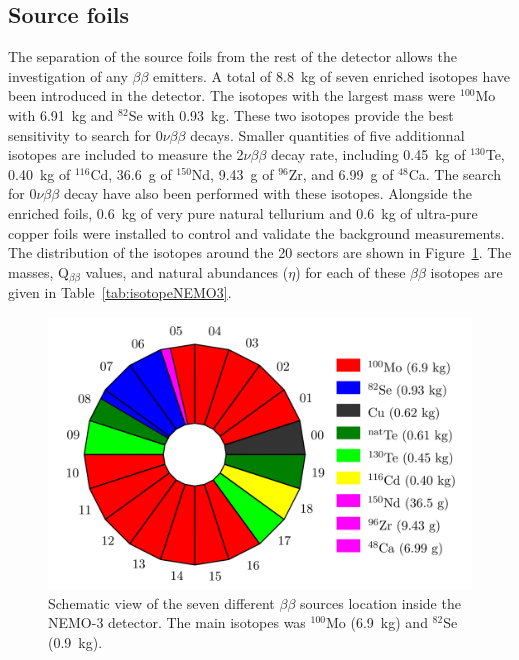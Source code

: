 \documentclass[main.tex]{subfiles}
\begin{document}
\FloatBarrier


\subsection{Source foils}


\NI The separation of the source foils from the rest of the detector allows the investigation of any $\beta\beta$ emitters. A total of 8.8~kg of seven enriched isotopes have been introduced in the detector. The isotopes with the largest mass were $^{\text{100}}$Mo with 6.91~kg and $^{\text{82}}$Se with 0.93~kg. These two isotopes provide the best sensitivity to search for 0$\nu\beta\beta$ decays. Smaller quantities of five additionnal isotopes are included to measure the 2$\nu\beta\beta$ decay rate, including 0.45~kg of $^{\text{130}}$Te, 0.40~kg of $^{\text{116}}$Cd, 36.6~g of $^{\text{150}}$Nd, 9.43~g of $^{\text{96}}$Zr, and 6.99~g of $^{\text{48}}$Ca. The search for 0$\nu\beta\beta$ decay have also been performed with these isotopes. Alongside the enriched foils, 0.6~kg of very pure natural tellurium and 0.6~kg of ultra-pure copper foils were installed to control and validate the background measurements. The distribution of the isotopes around the 20 sectors are shown in Figure~\ref{NEMO3Sector}. The masses, Q$_{\beta\beta}$ values, and natural abundances ($\eta$) for each of these $\beta\beta$ isotopes are given in Table~\ref{tab:isotopeNEMO3}.



\begin{figure}[h!]
\begin{center}
\includegraphics[scale=0.45]{pictures/Chap3/BBSourceDistribution.png}
\caption{Schematic view of the seven different $\beta\beta$ sources location inside the NEMO-3 detector. The main isotopes was $^{\text{100}}$Mo (6.9~kg) and $^{\text{82}}$Se (0.9~kg).}
\label{NEMO3Sector}
\end{center}
\end{figure}
\end{document}
